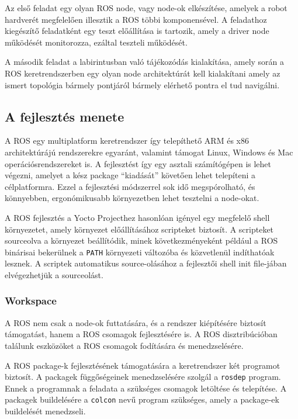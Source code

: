 \medskip

Az első feladat egy olyan ROS node, vagy node-ok elkészítése, amelyek a robot
hardverét megfelelően illesztik a ROS többi komponensével. A feladathoz
kiegészítő feladatként egy teszt előállítása is tartozik, amely a driver node
működését monitorozza, ezáltal teszteli működését.

\medskip

A második feladat a labirintusban való tájékozódás kialakítása, amely során a ROS
keretrendszerben egy olyan node architektúrát kell kialakítani amely az ismert
topológia bármely pontjáról bármely elérhető pontra el tud navigálni.

\subsection{A fejlesztés menete}

A ROS egy multiplatform keretrendszer így telepíthető ARM és x86 architektúrájú
rendszerekre egyaránt, valamint támogat Linux, Windows és Mac
operációsrendszereket is. A fejlesztést így egy asztali számítógépen is lehet
végezni, amelyet a kész package ``kiadását'' követően lehet telepíteni a
célplatformra. Ezzel a fejlesztési módszerrel sok idő megspórolható, és
könnyebben, ergonómikusabb környezetben lehet tesztelni a node-okat.

\medskip

A ROS fejlesztés a Yocto Projecthez hasonlóan igényel egy megfelelő shell
környezetet, amely környezet előállításához scripteket biztosít. A scripteket
sourceolva a környezet beállítódik, minek következményeként például a ROS
binárisai bekerülnek a \verb|PATH| környezeti változóba és közvetlenül
indíthatóak lesznek. A scriptek automatikus source-olásához a fejlesztői shell
init file-jában elvégezhetjük a sourceolást.

\subsubsection{Workspace}

A ROS nem csak a node-ok futtatására, és a rendszer kiépítésére biztosít
támogatást, hanem a ROS csomagok fejlesztésére is. A ROS disztribúcióban találunk
eszközöket a ROS csomagok fodítására és menedzselésére.

A ROS package-k fejlesztésének támogatására a keretrendszer két programot
biztosít. A packagek függőségeinek menedzselésére szolgál a \verb|rosdep|
program. Ennek a programnak a feladata a szükséges csomagok letöltése és
telepítése. A packagek buildelésére a \verb|colcon| nevű program szükséges, amely
a package-ek buildelését menedzseli.

